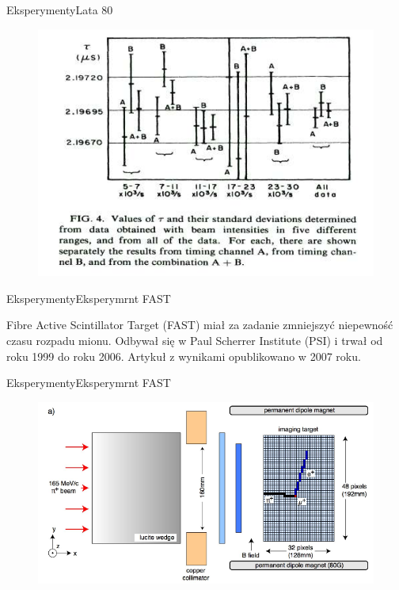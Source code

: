 \documentclass[xcolor={dvipsnames}]{beamer}
\begin{document}
\begin{frame}{Eksperymenty}{Lata 80}
    
    \begin{figure}
        \includegraphics[scale=0.8]{giovani3.PNG}
    \end{figure}

\end{frame}

\begin{frame}{Eksperymenty}{Eksperymrnt FAST}

    Fibre Active Scintillator Target (FAST) miał za zadanie zmniejszyć niepewność czasu rozpadu mionu. Odbywał się w Paul Scherrer Institute (PSI)  i trwał od roku 1999 do roku 2006. Artykuł z wynikami opublikowano w 2007 roku.

\end{frame}

\begin{frame}{Eksperymenty}{Eksperymrnt FAST}

    \begin{figure}
        \includegraphics[scale=0.8]{fast1.PNG}
    \end{figure}


\end{frame}
\end{document}

